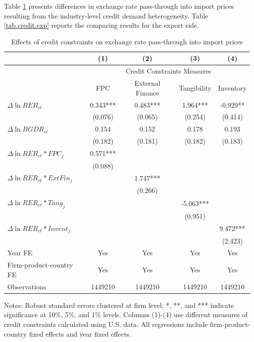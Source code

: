 \documentclass[12pt]{article}
\begin{document}
Table \ref{tab.credit} presents differences in exchange rate pass-through into import prices resulting from the industry-level credit demand heterogeneity. Table \ref{tab.credit.exp} reports the comparing results for the export side. 

\begin{table}[htbp]
	\centering
	\caption{Effects of credit constraints on exchange rate pass-through into import prices}
	\begin{threeparttable}	
		\begin{tabular}{lcccc}
			\toprule
			& (1)   & (2)   & (3)   & (4) \\
			\midrule
			 & \multicolumn{4}{c}{Credit Constraints Measures} \\
			& FPC   & External Finance & Tangibility & Inventory \\
			\midrule
			$\Delta \ln RER_{ct}$ & 0.343*** & 0.483*** & 1.964*** & -0.929** \\
			& (0.076) & (0.065) & (0.254) & (0.414) \\
			$\Delta \ln RGDR_{ct}$ & 0.154 & 0.152 & 0.178 & 0.193 \\
			& (0.182) & (0.181) & (0.182) & (0.183) \\
			$\Delta \ln RER_{ct}*FPC_{j}$ & 0.571*** &       &       &  \\
			& (0.088) &       &       &  \\
			$\Delta \ln RER_{ct}*ExtFin_{j}$ &       & 1.747*** &       &  \\
			&       & (0.266) &       &  \\
			$\Delta \ln RER_{ct}*Tang_{j}$ &       &       & -5.063*** &  \\
			&       &       & (0.951)  &  \\
			$\Delta \ln RER_{ct}*Invent_{j}$ &       &       &       & 9.472***  \\
			&       &       &       & (2.423)  \\
			Year FE  & Yes   & Yes   & Yes   & Yes \\
			Firm-product-country FE & Yes   & Yes   & Yes   & Yes \\
			Observations & 1449210 & 1449210 & 1449210 & 1449210 \\
			\bottomrule
		\end{tabular}
		\begin{tablenotes}
			\footnotesize
			\item[Notes:] Robust standard errors clustered at firm level;  *, **, and *** indicate significance at 10\%, 5\%, and 1\% levels. Columns (1)-(4) use different measures of credit constraints calculated using U.S. data. All regressions include firm-product-country fixed effects and year fixed effects.
		\end{tablenotes}
	\end{threeparttable}
	\label{tab.credit}
\end{table}
\end{document}
